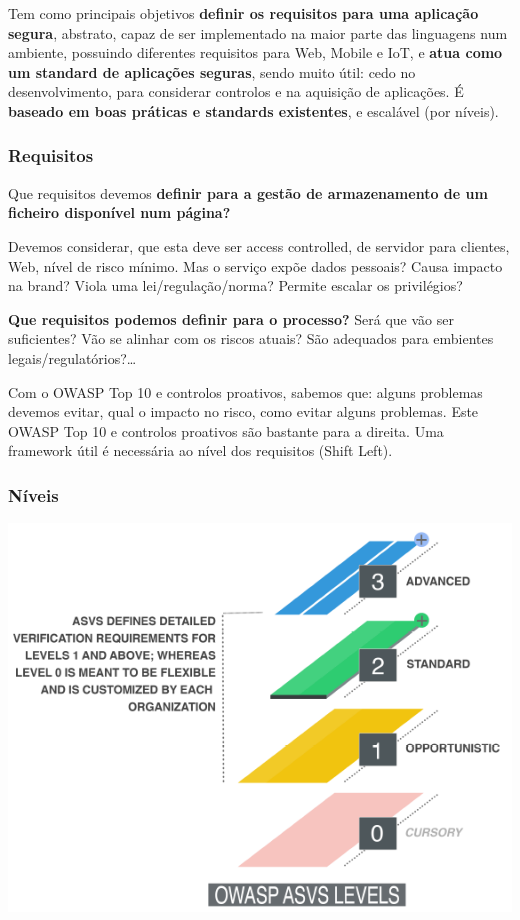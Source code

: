 \documentclass{article}
\begin{document}
Tem como principais objetivos \textbf{definir os requisitos para uma aplicação segura},
abstrato, capaz de ser implementado na maior parte das linguagens num ambiente, possuindo
diferentes requisitos para Web, Mobile e IoT, e \textbf{atua como um
standard de aplicações seguras}, sendo muito útil: cedo no desenvolvimento,
para considerar controlos e na aquisição de aplicações.
É \textbf{baseado em boas práticas e standards existentes}, e escalável
(por níveis).

\subsubsection{Requisitos}

Que requisitos devemos \textbf{definir para a gestão de armazenamento
de um ficheiro disponível num página?}

Devemos considerar, que esta deve ser access controlled,
de servidor para clientes, Web, nível de risco mínimo.
Mas o serviço expõe dados pessoais? Causa impacto na brand?
Viola uma lei/regulação/norma? Permite escalar os privilégios?

\textbf{Que requisitos podemos definir para o processo?} Será que vão ser suficientes?
Vão se alinhar com os riscos atuais? São adequados para embientes legais/regulatórios?\dots

\vspace{2mm}

Com o OWASP Top 10 e controlos proativos, sabemos que:
alguns problemas devemos evitar, qual o impacto no risco,
como evitar alguns problemas. Este OWASP Top 10 e
controlos proativos são bastante para a direita.
Uma framework útil é necessária ao nível dos requisitos
(Shift Left).

\subsubsection{Níveis}

\begin{center}
  \includegraphics[scale=0.5]{119}
\end{center}
\end{document}

